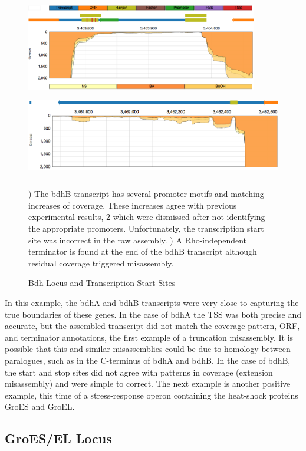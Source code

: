 \begin{figure}
\small
{\includegraphics[width=\textwidth,height=1.5in]{images/Assembly/Examples/Bdh/BdhB-TSS.png}
\label{fig:5.14a}}
{\includegraphics[width=\textwidth,height=1.5in]{images/Assembly/Examples/Bdh/BdhB-termination.png}
\label{fig:5.14b}}
\caption{Bdh Locus and Transcription Start Sites}
) The bdhB transcript has several promoter motifs and matching increases of coverage. These increases agree with previous experimental results\cite{73}, 2 which were dismissed after not identifying the appropriate promoters. Unfortunately, the transcription start site was incorrect in the raw assembly. ) A Rho-independent terminator is found at the end of the bdhB transcript although residual coverage triggered misassembly.
\end{figure}

In this example, the bdhA and bdhB transcripts were very close to capturing the true boundaries of these genes. In the case of bdhA the TSS was both precise and accurate, but the assembled transcript did not match the coverage pattern, ORF, and terminator annotations, the first example of a truncation misassembly. It is possible that this and similar misassemblies could be due to homology between paralogues, such as in the C-terminus of bdhA and bdhB. In the case of bdhB, the start and stop sites did not agree with patterns in coverage (extension misassembly) and were simple to correct. The next example is another positive example, this time of a stress-response operon containing the heat-shock proteins GroES and GroEL.

\subsection{GroES/EL Locus}
